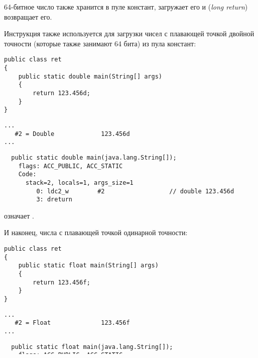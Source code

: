 64-битное число также хранится в пуле констант,  загружает его и  
(\emph{long return}) возвращает его.

Инструкция  также используется для загрузки чисел с плавающей точкой двойной 
точности (которые также занимают 64 бита) из пула констант:

\begin{lstlisting}[style=customjava]
public class ret
{
	public static double main(String[] args)
	{
		return 123.456d;
	}
}
\end{lstlisting}

\begin{lstlisting}[caption=Constant pool]
...
   #2 = Double             123.456d
...
\end{lstlisting}

\begin{lstlisting}
  public static double main(java.lang.String[]);
    flags: ACC_PUBLIC, ACC_STATIC
    Code:
      stack=2, locals=1, args_size=1
         0: ldc2_w        #2                  // double 123.456d
         3: dreturn       
\end{lstlisting}

 означает .

И наконец, числа с плавающей точкой одинарной точности:

\begin{lstlisting}[style=customjava]
public class ret
{
	public static float main(String[] args)
	{
		return 123.456f;
	}
}
\end{lstlisting}

\begin{lstlisting}[caption=Constant pool]
...
   #2 = Float              123.456f
...
\end{lstlisting}

\begin{lstlisting}
  public static float main(java.lang.String[]);
    flags: ACC_PUBLIC, ACC_STATIC
    Code:
      stack=1, locals=1, args_size=1
         0: ldc           #2                  // float 123.456f
         2: freturn       
\end{lstlisting}

Используемая здесь инструкция  та же, что и для загрузки 32-битных целочисленных чисел
из пула констант.

 означает .

А что насчет тех случаев, когда функция ничего не возвращает?

